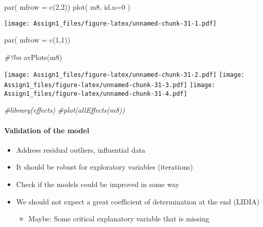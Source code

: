 \documentclass[
]{article}
\newenvironment{Shaded}{\begin{snugshade}}{\end{snugshade}}
\newcommand{\AttributeTok}[1]{\textcolor[rgb]{0.77,0.63,0.00}{#1}}
\newcommand{\CommentTok}[1]{\textcolor[rgb]{0.56,0.35,0.01}{\textit{#1}}}
\newcommand{\DecValTok}[1]{\textcolor[rgb]{0.00,0.00,0.81}{#1}}
\newcommand{\FunctionTok}[1]{\textcolor[rgb]{0.00,0.00,0.00}{#1}}
\newcommand{\NormalTok}[1]{#1}
\providecommand{\tightlist}{%
  \setlength{\itemsep}{0pt}\setlength{\parskip}{0pt}}
\begin{document}
\begin{Shaded}
\begin{Highlighting}[]
\FunctionTok{par}\NormalTok{( }\AttributeTok{mfrow =} \FunctionTok{c}\NormalTok{(}\DecValTok{2}\NormalTok{,}\DecValTok{2}\NormalTok{))}
\FunctionTok{plot}\NormalTok{( m8, }\AttributeTok{id.n=}\DecValTok{0}\NormalTok{ )}
\end{Highlighting}
\end{Shaded}

\texttt{[image: Assign1\_files/figure-latex/unnamed-chunk-31-1.pdf]}

\begin{Shaded}
\begin{Highlighting}[]
\FunctionTok{par}\NormalTok{( }\AttributeTok{mfrow =} \FunctionTok{c}\NormalTok{(}\DecValTok{1}\NormalTok{,}\DecValTok{1}\NormalTok{))}

\CommentTok{\#?lm}
\FunctionTok{avPlots}\NormalTok{(m8)}
\end{Highlighting}
\end{Shaded}

\texttt{[image: Assign1\_files/figure-latex/unnamed-chunk-31-2.pdf]}
\texttt{[image: Assign1\_files/figure-latex/unnamed-chunk-31-3.pdf]}
\texttt{[image: Assign1\_files/figure-latex/unnamed-chunk-31-4.pdf]}

\begin{Shaded}
\begin{Highlighting}[]
\CommentTok{\#library(effects)}
\CommentTok{\#plot(allEffects(m8))}
\end{Highlighting}
\end{Shaded}

\hypertarget{validation-of-the-model}{%
\paragraph{Validation of the model}\label{validation-of-the-model}}

\begin{itemize}
\item
  Address residual outliers, influential data
\item
  It should be robust for exploratory variables (iterations)
\item
  Check if the models could be improved in some way
\item
  We should not expect a great coefficient of determination at the end
  (LIDIA)

  \begin{itemize}
  \tightlist
  \item
    Maybe: Some critical explanatory variable that is missing
  \end{itemize}
\end{itemize}
\end{document}
